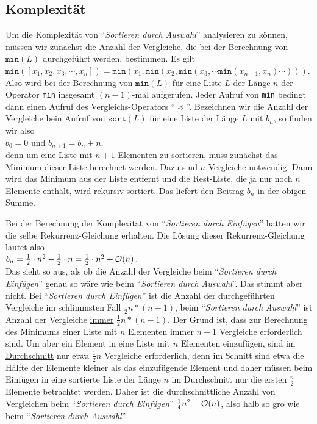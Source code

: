 \subsection{Komplexit\"at}
Um die Komplexit\"at von ``\emph{Sortieren durch Auswahl}'' analysieren zu k\"onnen, m\"ussen
wir zun\"achst die Anzahl der Vergleiche, die bei der Berechnung von $\mathtt{min}(L)$
durchgef\"uhrt werden, bestimmen.  Es gilt \\[0.2cm]
\hspace*{1.3cm} 
$\mathtt{min}([x_1,x_2,x_3,\cdots,x_n]) = \mathtt{min}(x_1, \mathtt{min}(x_2, \mathtt{min}(x_3, \cdots \mathtt{min}(x_{n-1},x_n) \cdots )))$. 
\\[0.2cm]
Also wird bei der Berechnung von $\texttt{min}(L)$ f\"ur eine Liste $L$ der L\"ange $n$ der Operator
\texttt{min} insgesamt $(n-1)$-mal aufgerufen.  Jeder Aufruf von \texttt{min} bedingt dann
einen Aufruf des Vergleichs-Operators ``$\preceq$''.
Bezeichnen wir die Anzahl der Vergleiche bein Aufruf von $\texttt{sort}(L)$ f\"ur eine
Liste der L\"ange $L$ mit $b_n$, so finden wir also \\[0.2cm]
\hspace*{1.3cm} $b_0 = 0$ \quad und \quad $b_{n+1} = b_n + n$, \hspace*{\fill}\\[0.2cm]
denn um eine Liste mit $n+1$ Elementen zu sortieren, muss zun\"achst das Minimum dieser
Liste berechnet werden.  Dazu sind $n$ Vergleiche notwendig.  Dann wird das Minimum aus
der Liste entfernt und die Rest-Liste, die ja nur noch $n$ Elemente enth\"alt, wird rekursiv
sortiert.  Das liefert den Beitrag $b_n$ in der obigen Summe.

Bei der Berechnung der Komplexit\"at von ``\emph{Sortieren durch Einf\"ugen}'' hatten wir die
selbe Rekurrenz-Gleichung erhalten.  Die L\"osung dieser Rekurrenz-Gleichung lautet also \\[0.2cm]
\hspace*{1.3cm} $b_n = \frac{1}{2} \cdot n^2 - \frac{1}{2}\cdot n = \frac{1}{2} \cdot n^2 + \mathcal{O}(n)$. \\[0.2cm]
Das sieht so aus, als ob die Anzahl der Vergleiche beim ``\emph{Sortieren durch
  Einf\"ugen}'' genau so w\"are wie beim ``\emph{Sortieren durch Auswahl}''.  Das stimmt aber
nicht.  Bei ``\emph{Sortieren durch Einf\"ugen}'' ist die Anzahl der durchgef\"uhrten
Vergleiche im schlimmsten Fall $\frac{1}{2}n*(n-1)$, beim ``\emph{Sortieren durch
  Auswahl}'' ist Anzahl der Vergleiche \underline{immer} $\frac{1}{2}n*(n-1)$.  Der Grund
ist, dass zur Berechnung des Minimums einer Liste mit $n$ Elementen immer $n-1$ Vergleiche
erforderlich sind.  Um aber ein Element in eine Liste mit $n$ Elementen einzuf\"ugen, sind
im \underline{Durchschnitt} nur etwa $\frac{1}{2}n$ Vergleiche erforderlich, denn im Schnitt sind etwa
die H\"alfte der Elemente kleiner als das einzuf\"ugende Element und daher m\"ussen beim Einf\"ugen
in eine sortierte Liste der L\"ange $n$ im Durchschnitt nur die ersten $\frac{n}{2}$
Elemente betrachtet werden.  Daher ist die durchschnittliche Anzahl von Vergleichen beim
``\emph{Sortieren durch Einf\"ugen}'' $\frac{1}{4}n^2 + \mathcal{O}(n)$, also halb so gro\3 wie beim
``\emph{Sortieren durch Auswahl}''.


